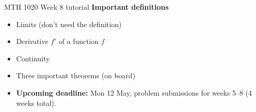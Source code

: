 \documentclass{beamer}
\begin{document}
\begin{frame}{MTH 1020 Week 8 tutorial}
  \textbf{Important definitions}
  \begin{itemize}
    \item Limits (don't need the definition)
    \item Derivative $f'$ of a function $f$
    \item Continuity
    \item Three important theorems (on board)
    \item \textbf{Upcoming deadline:} Mon 12 May, problem submissions for weeks 5--8 (4 weeks total).
  \end{itemize}
\end{frame}
\end{document}
